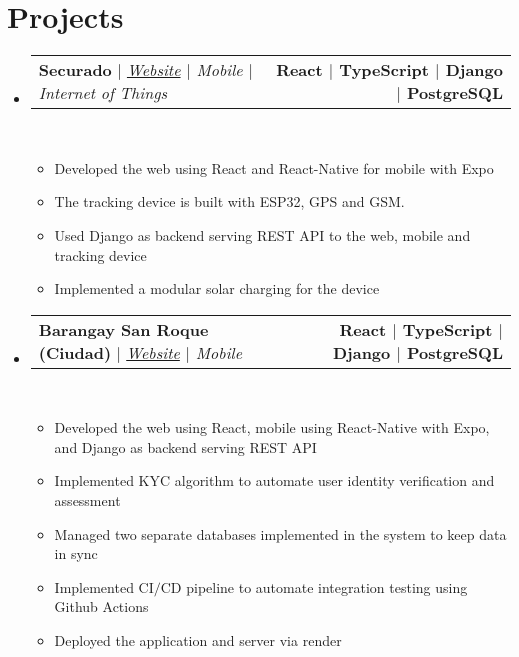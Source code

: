 \documentclass[letterpaper,11pt]{article}
\makeatletter
\newcommand{\resumeItem}[1]{
  \item\small{
    {#1 \vspace{0pt}}
  }
}
\newcommand{\resumeProjectHeading}[2]{
    \item
    \begin{tabular*}{1.001\textwidth}{l@{\extracolsep{\fill}}r}
      \small#1 & \textbf{\small #2}\\
    \end{tabular*}\vspace{-7pt}
}
\newcommand{\resumeSubHeadingListStart}{\begin{itemize}[leftmargin=0.0in, label={}]}
\newcommand{\resumeSubHeadingListEnd}{\end{itemize}}\vspace{0pt}
\newcommand{\resumeItemListStart}{\begin{itemize}}
\newcommand{\resumeItemListEnd}{\end{itemize}\vspace{-5pt}}
\makeatother
\begin{document}
\section{Projects} 
    \vspace{-5pt}
    \resumeSubHeadingListStart
    \resumeProjectHeading
            {\textbf{{Securado}} $|$ \emph{\href{https://mcgillscheduler.vercel.app/}{Website} {$|$} {Mobile} {$|$} {Internet of Things}}}{React $|$ TypeScript $|$ Django $|$ PostgreSQL}
            \\[5mm]
          \resumeItemListStart
            \resumeItem{Developed the web using React and React-Native for mobile with Expo}
            \resumeItem{The tracking device is built with ESP32, GPS and GSM.}
            \resumeItem{Used Django as backend serving REST API to the web, mobile and tracking device}
            \resumeItem{Implemented a modular solar charging for the device}
          \resumeItemListEnd
    \vspace{-20pt}
    \resumeProjectHeading
            {\textbf{{Barangay San Roque (Ciudad)}} $|$ \emph{\href{hthttps://www.sanroqueciudad.com/}{Website} {$|$} {Mobile}}}{React $|$ TypeScript $|$ Django $|$ PostgreSQL}
            \\[5mm]
          \resumeItemListStart
            \resumeItem{Developed the web using React, mobile using React-Native with Expo, and Django as backend serving REST API}
            \resumeItem{Implemented KYC algorithm to automate user identity verification and assessment}
            \resumeItem{Managed two separate databases implemented in the system to keep data in sync} 
            \resumeItem{Implemented CI{$/$}CD pipeline to automate integration testing using Github Actions}
            \resumeItem{Deployed the application and server via render} 
          \resumeItemListEnd
\resumeSubHeadingListEnd
\vspace{-12pt}
\end{document}
